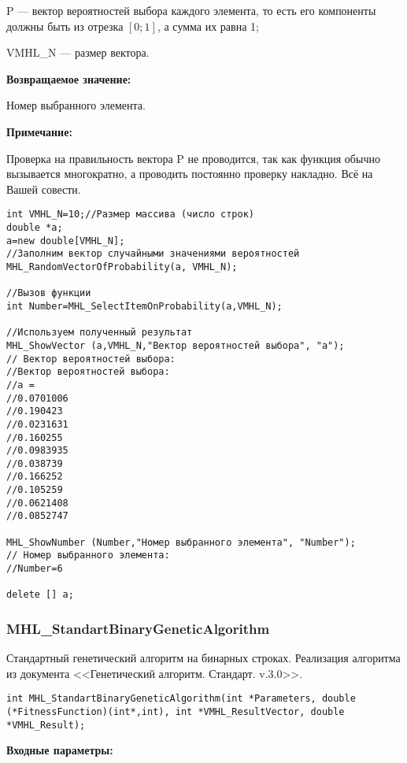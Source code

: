 \documentclass[a4paper,12pt]{article}
\begin{document}
 P --- вектор вероятностей выбора каждого элемента, то есть его компоненты должны быть из отрезка $[0;1]$, а сумма их равна 1;
 
 VMHL\_N --- размер вектора.

\textbf{Возвращаемое значение:} 

Номер выбранного элемента.

\textbf{Примечание:}

 Проверка на правильность вектора P не проводится, так как функция обычно вызывается многократно, а проводить постоянно проверку накладно. Всё на Вашей совести.



\begin{lstlisting}[label=code_use_MHL_SelectItemOnProbability,caption=Пример использования]
int VMHL_N=10;//Размер массива (число строк)
double *a;
a=new double[VMHL_N];
//Заполним вектор случайными значениями вероятностей
MHL_RandomVectorOfProbability(a, VMHL_N);

//Вызов функции
int Number=MHL_SelectItemOnProbability(a,VMHL_N);

//Используем полученный результат
MHL_ShowVector (a,VMHL_N,"Вектор вероятностей выбора", "a");
// Вектор вероятностей выбора:
//Вектор вероятностей выбора:
//a =
//0.0701006
//0.190423
//0.0231631
//0.160255
//0.0983935
//0.038739
//0.166252
//0.105259
//0.0621408
//0.0852747

MHL_ShowNumber (Number,"Номер выбранного элемента", "Number");
// Номер выбранного элемента:
//Number=6

delete [] a;
\end{lstlisting}

\subsubsection{MHL\_StandartBinaryGeneticAlgorithm}\label{MHL_StandartBinaryGeneticAlgorithm}

Стандартный генетический алгоритм на бинарных строках. Реализация алгоритма из документа <<Генетический алгоритм. Стандарт. v.3.0>>.


\begin{lstlisting}[label=code_syntax_MHL_StandartBinaryGeneticAlgorithm,caption=Синтаксис]
int MHL_StandartBinaryGeneticAlgorithm(int *Parameters, double (*FitnessFunction)(int*,int), int *VMHL_ResultVector, double *VMHL_Result);
\end{lstlisting}

\textbf{Входные параметры:}
 
\end{document}
